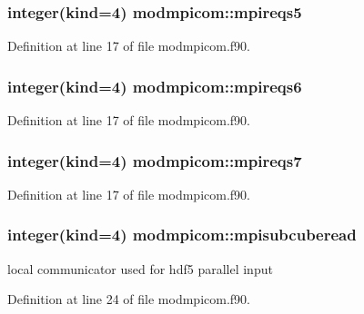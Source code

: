 \subsubsection[{\texorpdfstring{mpireqs5}{mpireqs5}}]{\setlength{\rightskip}{0pt plus 5cm}integer(kind=4) modmpicom\+::mpireqs5}\hypertarget{namespacemodmpicom_a74eac9af638b6438f5a6e0ba77997f33}{}\label{namespacemodmpicom_a74eac9af638b6438f5a6e0ba77997f33}


Definition at line 17 of file modmpicom.\+f90.

\subsubsection[{\texorpdfstring{mpireqs6}{mpireqs6}}]{\setlength{\rightskip}{0pt plus 5cm}integer(kind=4) modmpicom\+::mpireqs6}\hypertarget{namespacemodmpicom_adad671e20507f6639f50d87ec487534b}{}\label{namespacemodmpicom_adad671e20507f6639f50d87ec487534b}


Definition at line 17 of file modmpicom.\+f90.

\subsubsection[{\texorpdfstring{mpireqs7}{mpireqs7}}]{\setlength{\rightskip}{0pt plus 5cm}integer(kind=4) modmpicom\+::mpireqs7}\hypertarget{namespacemodmpicom_a42cc3c99615d14140b7b8088760ca8bd}{}\label{namespacemodmpicom_a42cc3c99615d14140b7b8088760ca8bd}


Definition at line 17 of file modmpicom.\+f90.

\subsubsection[{\texorpdfstring{mpisubcuberead}{mpisubcuberead}}]{\setlength{\rightskip}{0pt plus 5cm}integer(kind=4) modmpicom\+::mpisubcuberead}\hypertarget{namespacemodmpicom_afee5305bd782226daffc69f8db2af8a7}{}\label{namespacemodmpicom_afee5305bd782226daffc69f8db2af8a7}


local communicator used for hdf5 parallel input 



Definition at line 24 of file modmpicom.\+f90.

